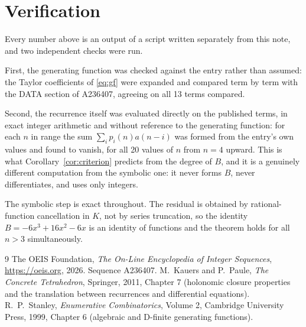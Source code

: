 \documentclass[11pt,a4paper]{article}
\theoremstyle{plain}
\theoremstyle{definition}
\begin{document}
\section{Verification}

Every number above is an output of a script written separately from this note, and two
independent checks were run.

First, the generating function was checked against the entry rather than assumed: the
Taylor coefficients of \eqref{eq:gf} were expanded and compared term by term with the DATA
section of A236407, agreeing on all 13 terms compared.

Second, the recurrence itself was evaluated directly on the published terms, in exact
integer arithmetic and without reference to the generating function: for each $n$ in range
the sum $\sum_{i}p_{i}(n)a(n-i)$ was formed from the entry's own values and found to
vanish, for all 20 values of $n$ from $n=4$ upward. This is what
Corollary~\ref{cor:criterion} predicts from the degree of $B$, and it is a genuinely
different computation from the symbolic one: it never forms $B$, never differentiates, and
uses only integers.

The symbolic step is exact throughout. The residual is obtained by rational-function
cancellation in $K$, not by series truncation, so the identity $B=- 6 x^{3} + 16 x^{2} - 6 x$ is an
identity of functions and the theorem holds for all $n>3$ simultaneously.

\begin{thebibliography}{9}
 The OEIS Foundation, \emph{The On-Line Encyclopedia of Integer Sequences},
\url{https://oeis.org}, 2026. Sequence A236407.
 M.~Kauers and P.~Paule, \emph{The Concrete Tetrahedron}, Springer, 2011,
Chapter 7 (holonomic closure properties and the translation between recurrences and
differential equations).
 R.~P.~Stanley, \emph{Enumerative Combinatorics}, Volume 2, Cambridge
University Press, 1999, Chapter 6 (algebraic and D-finite generating functions).
\end{thebibliography}
\end{document}
